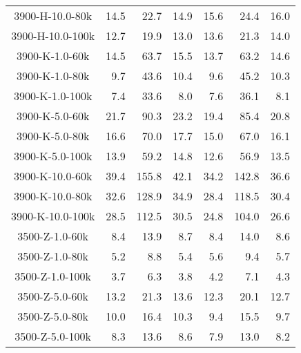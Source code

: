 \begin{longtable}{crrrrrr}
      3900-H-10.0-80k &        14.5 &        22.7 &        14.9 &           15.6 &           24.4 &           16.0 \\
      3900-H-10.0-100k &        12.7 &        19.9 &        13.0 &           13.6 &           21.3 &           14.0 \\
      3900-K-1.0-60k &        14.5 &        63.7 &        15.5 &           13.7 &           63.2 &           14.6 \\
      3900-K-1.0-80k &         9.7 &        43.6 &        10.4 &            9.6 &           45.2 &           10.3 \\
      3900-K-1.0-100k &         7.4 &        33.6 &         8.0 &            7.6 &           36.1 &            8.1 \\
      3900-K-5.0-60k &        21.7 &        90.3 &        23.2 &           19.4 &           85.4 &           20.8 \\
      3900-K-5.0-80k &        16.6 &        70.0 &        17.7 &           15.0 &           67.0 &           16.1 \\
      3900-K-5.0-100k &        13.9 &        59.2 &        14.8 &           12.6 &           56.9 &           13.5 \\
      3900-K-10.0-60k &        39.4 &       155.8 &        42.1 &           34.2 &          142.8 &           36.6 \\
      3900-K-10.0-80k &        32.6 &       128.9 &        34.9 &           28.4 &          118.5 &           30.4 \\
      3900-K-10.0-100k &        28.5 &       112.5 &        30.5 &           24.8 &          104.0 &           26.6 \\
      3500-Z-1.0-60k &         8.4 &        13.9 &         8.7 &            8.4 &           14.0 &            8.6 \\
      3500-Z-1.0-80k &         5.2 &         8.8 &         5.4 &            5.6 &            9.4 &            5.7 \\
      3500-Z-1.0-100k &         3.7 &         6.3 &         3.8 &            4.2 &            7.1 &            4.3 \\
      3500-Z-5.0-60k &        13.2 &        21.3 &        13.6 &           12.3 &           20.1 &           12.7 \\
      3500-Z-5.0-80k &        10.0 &        16.4 &        10.3 &            9.4 &           15.5 &            9.7 \\
      3500-Z-5.0-100k &         8.3 &        13.6 &         8.6 &            7.9 &           13.0 &            8.2 \\

\end{longtable}

